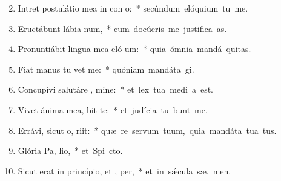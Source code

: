 \begin{flushleft}
\begin{enumerate}[leftmargin=*]
\setcounter{enumi}{1}

\item Intret postulátio mea in con o:~* \mbox{secúndum elóquium tu  me.}
\item Eructábunt lábia  num,~* \mbox{cum docúeris me justifica as.}
\item Pronuntiábit lingua mea eló um:~* \mbox{quia ómnia mandá  \textaccent{\'{\ae}}quitas.}
\item Fiat manus tu  vet me:~* \mbox{quóniam mandáta  gi.}
\item Concupívi salutáre , mine:~* \mbox{et lex tua medi a est.}
\item Vivet ánima mea,  bit te:~* \mbox{et judícia tu bunt me.}
\item Errávi, sicut o,  riit:~* \mbox{quæ re servum tuum, quia mandáta tua   tus.}
\item Glória Pa,  lio,~* \mbox{et Spi cto.}
\item Sicut erat in princípio, et ,  per,~* \mbox{et in s\'{\ae}cula sæ. men.}


\end{enumerate}
\end{flushleft}

